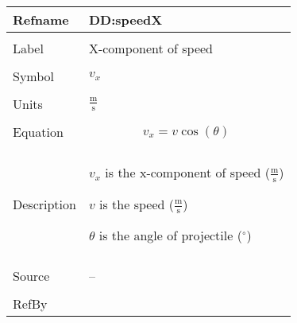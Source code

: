 \documentclass[12pt]{article}
\begin{document}
\noindent \begin{minipage}{\textwidth}
\begin{tabular}{p{} p{}}
\toprule \textbf{Refname} & \textbf{DD:speedX}
\label{DD:speedX}
\\ \midrule \\
Label & X-component of speed
\\ \midrule \\
Symbol & ${v_{x}}$
\\ \midrule \\
Units & $\frac{\text{m}}{\text{s}}$
\\ \midrule \\
Equation & \begin{displaymath}
           {v_{x}}=v \cos\left(θ\right)
           \end{displaymath}
\\ \midrule \\
Description & \begin{symbDescription}
              \item{${v_{x}}$ is the x-component of speed ($\frac{\text{m}}{\text{s}}$)}
              \item{$v$ is the speed ($\frac{\text{m}}{\text{s}}$)}
              \item{$θ$ is the angle of projectile (${}^{\circ}$)}
              \end{symbDescription}
\\ \midrule \\
Source & --
\\ \midrule \\
RefBy & 
\\ \bottomrule \end{tabular}
\end{minipage}
\par~
\end{document}
